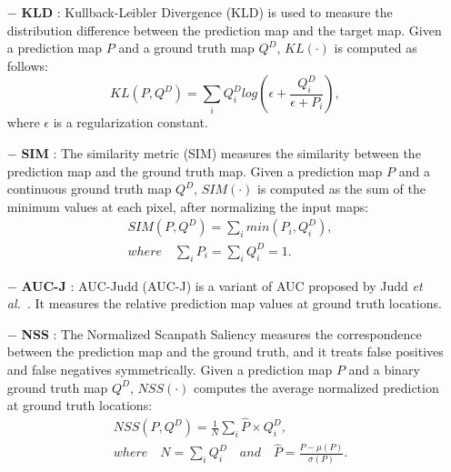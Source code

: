 \documentclass[journal,twoside]{IEEEtran}
\def\etal{{\em et al.~}}
\begin{document}
\begin{itemize}

\item [$\bm{-}$]
\textbf{KLD }\cite{bylinskii2018different}: Kullback-Leibler Divergence (KLD) is used to measure the distribution difference between the prediction map and the target map. Given a prediction map $P$ and a ground truth map $Q^{D}$, $KL(\cdot)$ is computed as follows:
\begin{equation}
   KL(P,Q^{D})=\sum_{i}Q_{i}^{D}log(\epsilon + \frac{Q_{i}^{D}}{\epsilon+P_{i}}), \label{eq:no20}
\end{equation}
where $\epsilon$ is a regularization constant.

\item [$\bm{-}$]
\textbf{SIM }\cite{swain1991color}: The similarity metric (SIM) measures the similarity between the prediction map and the ground truth map. Given a prediction map $P$ and a continuous ground truth map $Q^{D}$, $SIM(\cdot)$ is computed as the sum of the minimum values at each pixel, after normalizing the input maps:
\begin{equation}
\begin{split}
   &SIM (P,Q^{D})=\sum_{i}min(P_{i},Q_{i}^{D}),\\
    & where\quad \sum_{i}P_{i}=\sum_{i}Q_{i}^{D}=1. \label{eq:no21}
\end{split}
\end{equation}

\item [$\bm{-}$]
\textbf{AUC-J }\cite{DBLP:conf/iccv/JuddEDT09}: AUC-Judd (AUC-J) is a variant of AUC proposed by Judd \etal \cite{DBLP:conf/iccv/JuddEDT09}. It measures the relative prediction map values at ground truth locations.

\item [$\bm{-}$]
\textbf{NSS }\cite{peters2005components}: The Normalized Scanpath Saliency measures the correspondence between the prediction map and the ground truth, and it treats false positives and false negatives symmetrically. Given a prediction map $P$ and a binary ground truth map $Q^{D}$, $NSS(\cdot)$ computes the average normalized prediction at ground truth locations:
\begin{equation}
\begin{split}
   &NSS(P,Q^{D})=\frac{1}{N}\sum_{i}\hat{P}\times Q_{i}^{D},\\
    & where\quad N=\sum_{i}Q_{i}^{D}\quad and \quad \hat{P}=\frac{P-\mu(P)}{\sigma(P)}. \label{eq:no22}
\end{split}
\end{equation}

\end{itemize}
\end{document}
